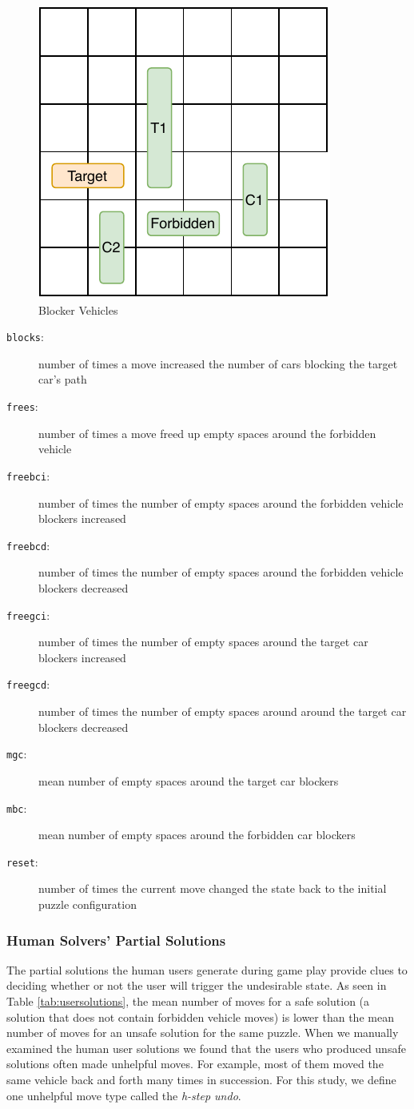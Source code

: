 \begin{figure}[htb]
  \centering
\includegraphics[width=0.35\columnwidth]{img/blockers.pdf}
  \caption{Blocker Vehicles}
  \label{fig:blockers}
\end{figure}
\begin{description}
\item[\texttt{blocks}:] number of times a move increased the number of cars blocking the target car's path
\item[\texttt{frees}:] number of times a move freed up empty spaces around the forbidden vehicle
\item[\texttt{freebci}:] number of times the number of empty spaces around the forbidden vehicle blockers increased
\item[\texttt{freebcd}:] number of times the number of empty spaces around the forbidden vehicle blockers decreased
\item[\texttt{freegci}:] number of times the number of empty spaces around the target car blockers increased
\item[\texttt{freegcd}:] number of times the number of empty spaces around around the target car blockers decreased
\item[\texttt{mgc}:] mean number of empty spaces around the target car blockers
\item[\texttt{mbc}:] mean number of empty spaces around the forbidden car blockers
\item[\texttt{reset}:] number of times the current move changed the state back to the initial puzzle configuration
\end{description}

\subsubsection*{Human Solvers' Partial Solutions}
The partial solutions the human users generate during game play provide clues to deciding whether or not the user will trigger the undesirable state. As seen in Table \ref{tab:usersolutions}, the mean number of moves for a safe solution (a solution that does not contain forbidden vehicle moves) is lower than the mean number of moves for an unsafe solution for the same puzzle. When we manually examined the human user solutions we found that the users who produced unsafe solutions often made unhelpful moves. For example, most of them moved the same vehicle back and forth many times in succession. For this study, we define one unhelpful move type called the \textit{h-step undo}.


